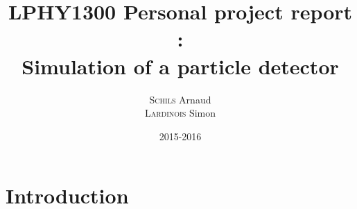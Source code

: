 \documentclass[11pt]{report}
\title{LPHY1300 Personal project report :\\ Simulation of a particle detector}
\author{\textsc{Schils} Arnaud\\ \textsc{Lardinois} Simon}
\date{2015-2016}
\begin{document}
\maketitle

\renewcommand{\contentsname}{Sommaire}
\tableofcontents

\section*{Introduction}
\end{document}
